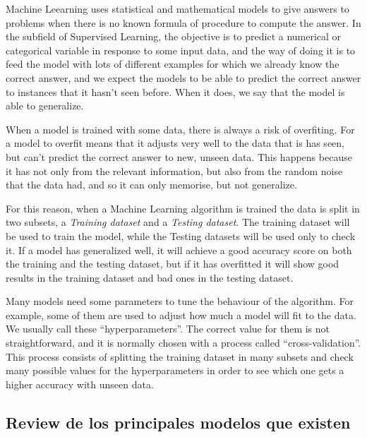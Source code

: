 \begin{pre-delivery}
  Machine Leearning uses statistical and mathematical models to give answers to
  problems when there is no known formula of procedure to compute the answer.
  In the subfield of Supervised Learning, the objective is to predict a numerical
  or categorical variable in response to some input data, and the way of doing
  it is to feed the model with lots of different examples for which we already
  know the correct answer, and we expect the models to be able to predict
  the correct answer to instances that it hasn't seen before. When it does,
  we say that the model is able to generalize.

  When a model is trained with some data, there is always a risk of overfiting.
  For a model to overfit means that it adjusts very well to the data that is
  has seen, but can't predict the correct answer to new, unseen data. This
  happens because it has not only from the relevant information, but also
  from the random noise that the data had, and so it can only memorise, but
  not generalize.

  For this reason, when a Machine Learning algorithm is trained the data
  is split in two subsets, a \textit{Training  dataset} and a \textit{Testing
  dataset}. The training dataset will be used to train the model, while the
  Testing datasets will be used only to check it. If a model has generalized
  well, it will achieve a good accuracy score on both the training and the
  testing dataset, but if it has overfitted it will show good results in the
  training dataset and bad ones in the testing dataset.

  Many models need some parameters to tune the behaviour of the algorithm. For
  example, some of them are used to adjust how much a model will fit to the data.
  We usually call these ``hyperparameters''. The correct value for them is not
  straightforward, and it is normally chosen with a process called
  ``cross-validation''. This process consists of splitting the training dataset
  in many subsets and check many possible values for the hyperparameters in order
  to see which one gets a higher accuracy with unseen data.
\end{pre-delivery}

\begin{note}
  \section{Review de los principales modelos que existen}
\end{note}
